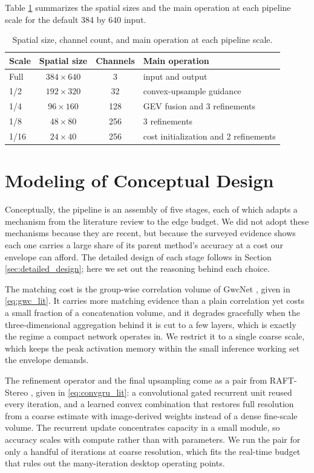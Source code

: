Table \ref{tab:scales} summarizes the spatial sizes and the main
operation at each pipeline scale for the default 384 by 640 input.

\begin{table}[!htbp]
\centering
\caption{Spatial size, channel count, and main operation at each pipeline scale.}
\label{tab:scales}
\small
\begin{tabular}{lccl}
\toprule
Scale & Spatial size & Channels & Main operation\\
\midrule
Full & $384\times 640$ & 3 & input and output\\
1/2 & $192\times 320$ & 32 & convex-upsample guidance\\
1/4 & $96\times 160$ & 128 & GEV fusion and 3 refinements\\
1/8 & $48\times 80$ & 256 & 3 refinements\\
1/16 & $24\times 40$ & 256 & cost initialization and 2 refinements\\
\bottomrule
\end{tabular}
\end{table}

\FloatBarrier
\section{Modeling of Conceptual Design}
\label{sec:conceptual_design}
Conceptually, the pipeline is an assembly of five stages, each of which
adapts a mechanism from the literature review to the edge budget. We did
not adopt these mechanisms because they are recent, but because the
surveyed evidence shows each one carries a large share of its parent
method's accuracy at a cost our envelope can afford. The detailed design
of each stage follows in Section \ref{sec:detailed_design}; here we set
out the reasoning behind each choice.

The matching cost is the group-wise correlation volume of GwcNet
\cite{guo2019gwcnet}, given in \eqref{eq:gwc_lit}. It carries more
matching evidence than a plain correlation yet costs a small fraction of
a concatenation volume, and it degrades gracefully when the
three-dimensional aggregation behind it is cut to a few layers, which is
exactly the regime a compact network operates in. We restrict it to a
single coarse scale, which keeps the peak activation memory within the
small inference working set the envelope demands.

The refinement operator and the final upsampling come as a pair from
RAFT-Stereo \cite{lipson2021raftstereo}, given in \eqref{eq:convgru_lit}:
a convolutional gated recurrent unit reused every iteration, and a
learned convex combination that restores full resolution from a coarse
estimate with image-derived weights instead of a dense fine-scale volume.
The recurrent update concentrates capacity in a small module, so accuracy
scales with compute rather than with parameters. We run the pair for only
a handful of iterations at coarse resolution, which fits the real-time
budget that rules out the many-iteration desktop operating points.

